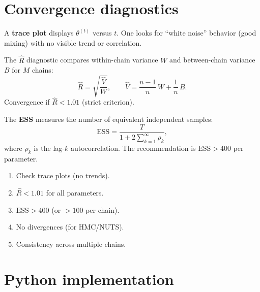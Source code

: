 \section{Convergence diagnostics}

\begin{definition}
A \textbf{trace plot} displays $\theta^{(t)}$ versus $t$. One looks
for ``white noise'' behavior (good mixing) with no visible trend or
correlation.
\end{definition}

\begin{definition}
The $\hat{R}$ diagnostic compares within-chain variance $W$ and
between-chain variance $B$ for $M$ chains:
\[
  \hat{R} = \sqrt{\frac{\hat{V}}{W}}, \qquad
  \hat{V} = \frac{n-1}{n}\,W + \frac{1}{n}\,B.
\]
Convergence if $\hat{R} < 1.01$ (strict criterion).
\end{definition}

\begin{definition}
The \textbf{ESS} measures the number of equivalent independent samples:
\[
  \text{ESS} = \frac{T}{1 + 2\sum_{k=1}^\infty \rho_k},
\]
where $\rho_k$ is the lag-$k$ autocorrelation. The recommendation is
$\text{ESS} > 400$ per parameter.
\end{definition}

\begin{keyformulas}[title=\textbf{MCMC diagnostics checklist}]
\begin{enumerate}
  \item Check trace plots (no trends).
  \item $\hat{R} < 1.01$ for all parameters.
  \item $\text{ESS} > 400$ (or $> 100$ per chain).
  \item No divergences (for HMC/NUTS).
  \item Consistency across multiple chains.
\end{enumerate}
\end{keyformulas}

\section{Python implementation}

